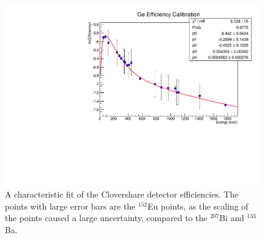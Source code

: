 \begin{figure}[t]
    \centering
    \includegraphics[scale=0.7]{Setup_Figs/Clover1_Eff_05232017.pdf}
    \caption{A characteristic fit of the Clovershare detector efficiencies. The points with large error bars are the $^{152}$Eu points, as the scaling of the points caused a large uncertainty, compared to the $^{207}$Bi and $^{133}$Ba.}
    \label{fig:clover_eff}
\end{figure}